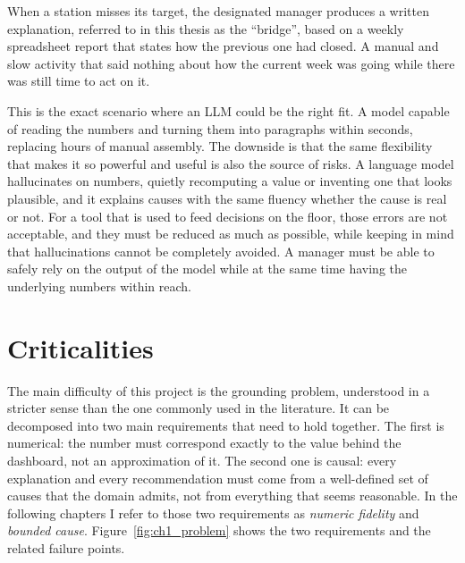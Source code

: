 \documentclass[12pt,a4paper,openright,twoside]{book}
\begin{document}
When a station misses its target, the designated manager produces a written explanation, referred to in this thesis as the \enquote{bridge}, based on a weekly spreadsheet report that states how the previous one had closed. A manual and slow activity that said nothing about how the current week was going while there was still time to act on it.

This is the exact scenario where an \ac{LLM} could be the right fit. 
A model capable of reading the numbers and turning them into paragraphs within seconds, replacing hours of manual assembly.
The downside is that the same flexibility that makes it so powerful and useful is also the source of risks.
A language model hallucinates on numbers, quietly recomputing a value or inventing one that looks plausible, and it explains causes with the same fluency whether the cause is real or not.
For a tool that is used to feed decisions on the floor, those errors are not acceptable, and they must be reduced as much as possible, while keeping in mind that hallucinations cannot be completely avoided. 
A manager must be able to safely rely on the output of the model while at the same time having the underlying numbers within reach. 


\section{Criticalities}
The main difficulty of this project is the grounding problem, understood in a stricter sense than the one commonly used in the literature.
It can be decomposed into two main requirements that need to hold together. 
The first is numerical: the number must correspond exactly to the value behind the dashboard, not an approximation of it.
The second one is causal: every explanation and every recommendation must come from a well-defined set of causes that the domain admits, not from everything that seems reasonable.
In the following chapters I refer to those two requirements as \emph{numeric fidelity} and \emph{bounded cause}.
Figure~\ref{fig:ch1_problem} shows the two requirements and the related failure points.
\end{document}
